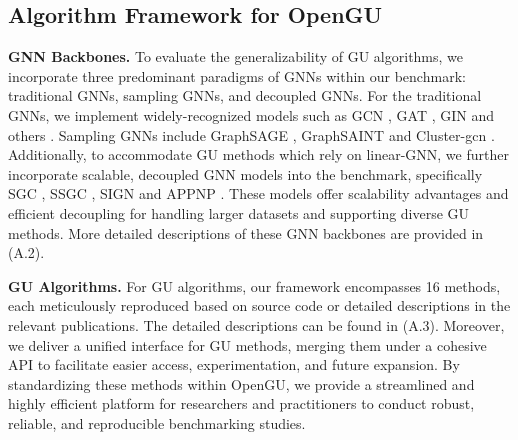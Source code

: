 



\subsection{Algorithm Framework for OpenGU}
\label{alg}
\textbf{GNN Backbones.} To evaluate the generalizability of GU algorithms, we incorporate three predominant paradigms of GNNs within our benchmark: traditional GNNs, sampling GNNs, and decoupled GNNs. For the traditional GNNs, we implement widely-recognized models such as GCN \cite{kipf2016gcn}, GAT \cite{velivckovic2017gat}, GIN \cite{xu2018gin} and others \cite{chen2020gcnii, brody2021gatv2, LightGCN}.
Sampling GNNs include GraphSAGE \cite{hamilton2017graphsage}, GraphSAINT \cite{zeng2019graphsaint} and Cluster-gcn \cite{chiang2019cluster-gcn}. Additionally, to accommodate GU methods which rely on linear-GNN, we further incorporate scalable, decoupled GNN models into the benchmark, specifically SGC \cite{wu2019sgc}, SSGC \cite{zhu2021ssgc}, SIGN \cite{frasca2020sign} and APPNP \cite{2019appnp}. These models offer scalability advantages and efficient decoupling for handling larger datasets and supporting diverse GU methods. 
More detailed descriptions of these GNN backbones are provided in \cite{OpenGU2025} (A.2).

\noindent \textbf{GU Algorithms.} For GU algorithms, our framework encompasses 16 methods, each meticulously reproduced based on source code or detailed descriptions in the relevant publications. 
The detailed descriptions can be found in \cite{OpenGU2025} (A.3). 
Moreover, we deliver a unified interface for GU methods, merging them under a cohesive API to facilitate easier access, experimentation, and future expansion. By standardizing these methods within OpenGU, we provide a streamlined and highly efficient platform for researchers and practitioners to conduct robust, reliable, and reproducible benchmarking studies. 

